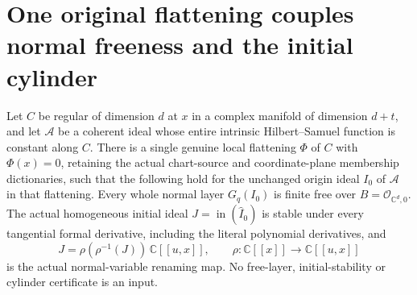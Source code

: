 \section{One original flattening couples normal freeness and the initial cylinder}

\begin{theorem}
\label{hir:actual-original-coupled-normal-free-initial-cylinder}
\leanok
{}
Let $C$ be regular of dimension $d$ at $x$ in a complex manifold of
 dimension $d+t$, and let $\mathcal A$ be a coherent ideal whose entire
 intrinsic Hilbert--Samuel function is constant along $C$.
There is a single genuine local flattening $\Phi$ of $C$ with
$\Phi(x)=0$, retaining the actual chart-source and coordinate-plane
membership dictionaries, such that the following hold for the unchanged
origin ideal $I_0$ of $\mathcal A$ in that flattening. Every whole
normal layer $G_q(I_0)$ is finite free over
$B=\mathcal O_{\mathbb C^d,0}$. The actual homogeneous initial ideal
$J=\operatorname{in}(\widehat I_0)$ is stable under every tangential
formal derivative, including the literal polynomial derivatives, and
\[
 J=\rho(\rho^{-1}(J))\,\mathbb C[[u,x]],
 \qquad \rho:\mathbb C[[x]]\longrightarrow\mathbb C[[u,x]]
\]
is the actual normal-variable renaming map. No free-layer,
initial-stability or cylinder certificate is an input.
\end{theorem}
